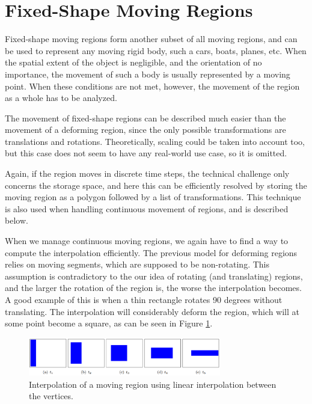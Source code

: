 \section{Fixed-Shape Moving Regions}
\label{section:fixed_shape_regions}

Fixed-shape moving regions form another subset of all moving regions, and can be used to represent any moving rigid body, such a cars, boats, planes, etc. When the spatial extent of the object is negligible, and the orientation of no importance, the movement of such a body is usually represented by a moving point. When these conditions are not met, however, the movement of the region as a whole has to be analyzed.

The movement of fixed-shape regions can be described much easier than the movement of a deforming region, since the only possible transformations are translations and rotations. Theoretically, scaling could be taken into account too, but this case does not seem to have any real-world use case, so it is omitted.

Again, if the region moves in discrete time steps, the technical challenge only concerns the storage space, and here this can be efficiently resolved by storing the moving region as a polygon followed by a list of transformations. This technique is also used when handling continuous movement of regions, and is described below.

When we manage continuous moving regions, we again have to find a way to compute the interpolation efficiently. The previous model for deforming regions relies on moving segments, which are supposed to be non-rotating. This assumption is contradictory to the our idea of rotating (and translating) regions, and the larger the rotation of the region is, the worse the interpolation becomes. A good example of this is when a thin rectangle rotates 90 degrees without translating. The interpolation will considerably deform the region, which will at some point become a square, as can be seen in Figure \ref{fig:vertices_interpolation}.

\begin{figure}[h!]
    \centering
    \includegraphics[width=0.75\textwidth]{images/vertices_interpolation.png}
    \caption[Linear interpolation of the vertices of a moving region]{Interpolation of a moving region using linear interpolation between the vertices. \cite{fmregion}}
    \label{fig:vertices_interpolation}
\end{figure}


